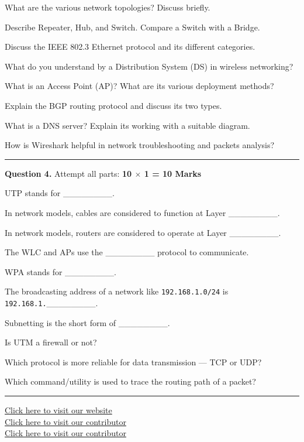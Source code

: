 \documentclass[11pt,a4paper]{article}
\begin{document}
\begin{parts}
  \item What are the various network topologies? Discuss briefly.
  \item Describe Repeater, Hub, and Switch. Compare a Switch with a Bridge.
  \item Discuss the IEEE 802.3 Ethernet protocol and its different categories.
  \item What do you understand by a Distribution System (DS) in wireless networking?
  \item What is an Access Point (AP)? What are its various deployment methods?
  \item Explain the BGP routing protocol and discuss its two types.
  \item What is a DNS server? Explain its working with a suitable diagram.
  \item How is Wireshark helpful in network troubleshooting and packets analysis?
\end{parts}

\bigskip


\rule{\linewidth}{0.4pt}\smallskip




\noindent   \textbf{Question 4.} Attempt all parts: \hfill   \textbf{10 $ \times$ 1 = 10 Marks}

\begin{parts}
  \item UTP stands for \_\_\_\_\_\_\_\_.
  \item In network models, cables are considered to function at Layer \_\_\_\_\_\_\_\_.
  \item In network models, routers are considered to operate at Layer \_\_\_\_\_\_\_\_.
  \item The WLC and APs use the \_\_\_\_\_\_\_\_ protocol to communicate.
  \item WPA stands for \_\_\_\_\_\_\_\_.
  \item The broadcasting address of a network like   \texttt{192.168.1.0/24} is   \texttt{192.168.1.}\_\_\_\_\_\_\_\_.
  \item Subnetting is the short form of \_\_\_\_\_\_\_\_.
  \item Is UTM a firewall or not?
  \item Which protocol is more reliable for data transmission --- TCP or UDP?
  \item Which command/utility is used to trace the routing path of a packet?
\end{parts}


\vfill
\rule{\linewidth}{0.4pt}

\begin{center}\small
\href{https://bhu-exam.vercel.app/}{Click here to visit our website}\\[4pt]\href{https://me-aryan.vercel.app/}{Click here to visit our contributor}\\[4pt]\href{https://quashan-me.vercel.app/}{Click here to visit our contributor}
\end{center}
\end{document}
